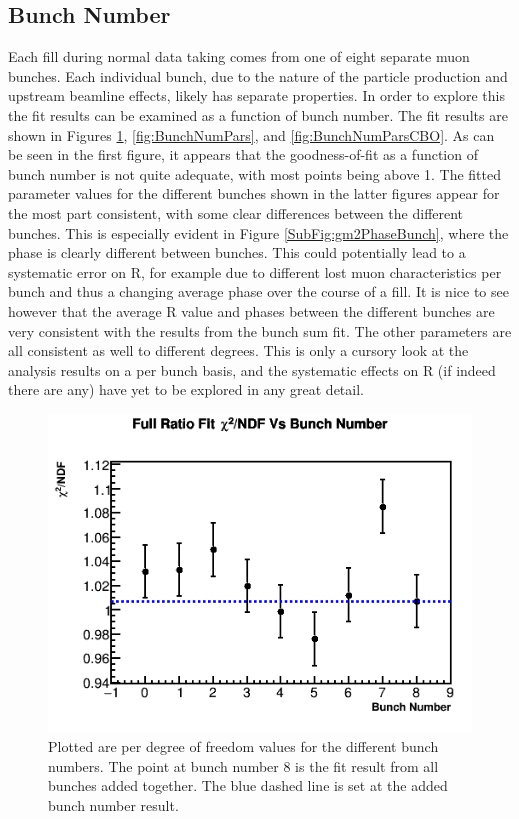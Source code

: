 	\subsection{Bunch Number}

		Each fill during normal data taking comes from one of eight separate muon bunches. Each individual bunch, due to the nature of the particle production and upstream beamline effects, likely has separate properties. In order to explore this the fit results can be examined as a function of bunch number. The fit results are shown in Figures \ref{fig:BunchNumChi2}, \ref{fig:BunchNumPars}, and \ref{fig:BunchNumParsCBO}. As can be seen in the first figure, it appears that the goodness-of-fit as a function of bunch number is not quite adequate, with most points being above 1. The fitted parameter values for the different bunches shown in the latter figures appear for the most part consistent, with some clear differences between the different bunches. This is especially evident in Figure \ref{SubFig:gm2PhaseBunch}, where the \gmtwo phase is clearly different between bunches. This could potentially lead to a systematic error on R, for example due to different lost muon characteristics per bunch and thus a changing average \gmtwo phase over the course of a fill. It is nice to see however that the average R value and \gmtwo phases between the different bunches are very consistent with the results from the bunch sum fit. The other parameters are all consistent as well to different degrees. This is only a cursory look at the analysis results on a per bunch basis, and the systematic effects on R (if indeed there are any) have yet to be explored in any great detail.

		\begin{figure}[]
			\centering
			\includegraphics[width=.6\textwidth]{RatioCBO_Chi2NDF_Vs_BunchNum_Canv}
		    \caption[BunchNumChi2]{Plotted are \chisq per degree of freedom values for the different bunch numbers. The point at bunch number 8 is the fit result from all bunches added together. The blue dashed line is set at the added bunch number result.}
		    \label{fig:BunchNumChi2}
		\end{figure}


